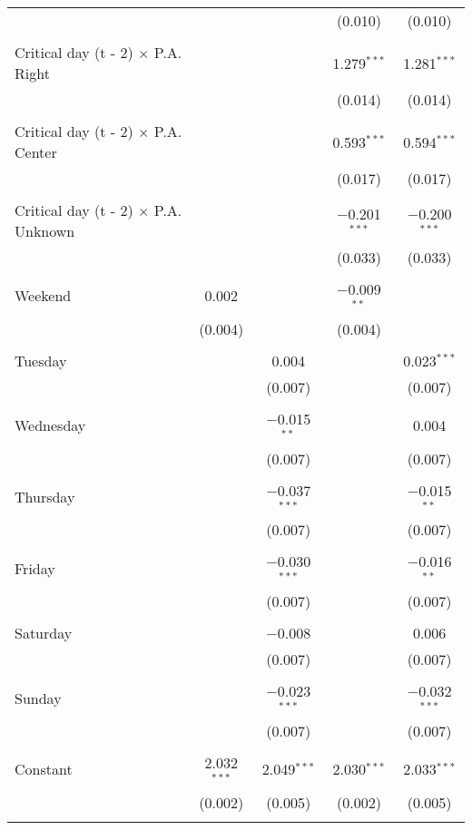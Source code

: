 \documentclass[
]{article}
\begin{document}
\begin{table}[!htbp]
{\begin{tabular}{@{\extracolsep{5pt}}lcccc}
  &  &  & (0.010) & (0.010) \\ 
  & & & & \\ 
 Critical day (t - 2) $\times$ P.A. Right &  &  & 1.279$^{***}$ & 1.281$^{***}$ \\ 
  &  &  & (0.014) & (0.014) \\ 
  & & & & \\ 
 Critical day (t - 2) $\times$ P.A. Center &  &  & 0.593$^{***}$ & 0.594$^{***}$ \\ 
  &  &  & (0.017) & (0.017) \\ 
  & & & & \\ 
 Critical day (t - 2) $\times$ P.A. Unknown &  &  & $-$0.201$^{***}$ & $-$0.200$^{***}$ \\ 
  &  &  & (0.033) & (0.033) \\ 
  & & & & \\ 
 Weekend & 0.002 &  & $-$0.009$^{**}$ &  \\ 
  & (0.004) &  & (0.004) &  \\ 
  & & & & \\ 
 Tuesday &  & 0.004 &  & 0.023$^{***}$ \\ 
  &  & (0.007) &  & (0.007) \\ 
  & & & & \\ 
 Wednesday &  & $-$0.015$^{**}$ &  & 0.004 \\ 
  &  & (0.007) &  & (0.007) \\ 
  & & & & \\ 
 Thursday &  & $-$0.037$^{***}$ &  & $-$0.015$^{**}$ \\ 
  &  & (0.007) &  & (0.007) \\ 
  & & & & \\ 
 Friday &  & $-$0.030$^{***}$ &  & $-$0.016$^{**}$ \\ 
  &  & (0.007) &  & (0.007) \\ 
  & & & & \\ 
 Saturday &  & $-$0.008 &  & 0.006 \\ 
  &  & (0.007) &  & (0.007) \\ 
  & & & & \\ 
 Sunday &  & $-$0.023$^{***}$ &  & $-$0.032$^{***}$ \\ 
  &  & (0.007) &  & (0.007) \\ 
  & & & & \\ 
 Constant & 2.032$^{***}$ & 2.049$^{***}$ & 2.030$^{***}$ & 2.033$^{***}$ \\ 
  & (0.002) & (0.005) & (0.002) & (0.005) \\ 
  & & & & \\ 

\end{tabular}}
\end{table}
\end{document}
